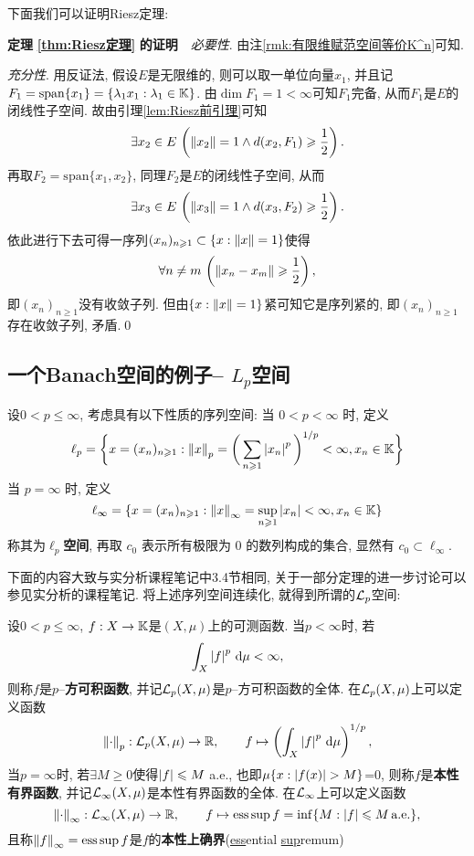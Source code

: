 	下面我们可以证明Riesz定理:

	\textbf{定理\,\,\ref{thm:Riesz定理}\,\,的证明}\ \ \textsl{必要性}. 由注\ref{rmk:有限维赋范空间等价K^n}可知.

	\textsl{充分性}. 用反证法, 假设$ E $是无限维的, 则可以取一单位向量$ x_1 $, 并且记$ F_1=\mathrm{span}\{x_1\}=\{ \lambda_1x_1 : \lambda_1\in\mathbb{K} \} $. 由$ \dim F_1=1<\infty $可知$ F_1 $完备, 从而$ F_1 $是$ E $的闭线性子空间. 故由引理\ref{lem:Riesz前引理}可知
	\[
	\exists x_2\in E\,\left(\left\| x_2 \right\|=1\land d(x_2,F_1)\geqslant\frac{1}{2}\right).
	\]
	再取$ F_2=\mathrm{span}\{x_1,x_2\} $, 同理$ F_2 $是$ E $的闭线性子空间, 从而
	\[
	\exists x_3\in E\,\left(\left\| x_3 \right\|=1\land d(x_3,F_2)\geqslant\frac{1}{2}\right).
	\]
	依此进行下去可得一序列$ (x_n)_{n\geqslant 1}\subset\{ x : \left\| x \right\|=1 \} $使得
	\[
	\forall n\ne m\,\left(\left\| x_n-x_m \right\|\geqslant\frac{1}{2}\right),
	\]
	即$ (x_n)_{n\geqslant 1} $没有收敛子列. 但由$ \{ x : \left\| x \right\|=1 \} $紧可知它是序列紧的, 即$ (x_n)_{n\geqslant 1} $存在收敛子列, 矛盾.\qed

	\subsection{一个Banach空间的例子-- $ L_p $空间}

	\begin{Definition}[$ \ell_{p} $空间]\label{def:lp空间}
		设$ 0<p\leqslant\infty $, 考虑具有以下性质的序列空间:
		当 $ 0<p<\infty $ 时, 定义
		\[
			\ell_{p}=\bigg\{ x=(x_{n})_{n\geqslant1}: \left\| x \right\|_{p}=\bigg( \sum\limits_{n\geqslant1}\left| x_{n} \right| ^{p} \bigg)^{1/p}<\infty, x_{n}\in\mathbb{K} \bigg\}
		\]
		 当 $ p=\infty $ 时, 定义
		 \[
			 \ell_{\infty}=\{ x=(x_{n})_{n\geqslant1}:\left\| x \right\|_{\infty}=\sup_{n\geqslant1}\left| x_{n} \right| <\infty, x_{n}\in\mathbb{K} \}
		 \]
		 称其为\textbf{$ \ell_{p} $空间}, 再取 $ c_{0} $ 表示所有极限为 $ 0 $ 的数列构成的集合, 显然有 $ c_{0}\subset\ell_{\infty} $.
	\end{Definition}

	下面的内容大致与实分析课程笔记中3.4节相同, 关于一部分定理的进一步讨论可以参见实分析的课程笔记. 将上述序列空间连续化, 就得到所谓的$ \CL_p $空间:

	\begin{Definition}[$ \CL_p $空间]\label{def:Lp空间}
		设$ 0<p\leqslant\infty $, $ f : X\to\mathbb{K} $是$ (X,\mu) $上的可测函数. 当$ p<\infty $时, 若
		\[
		\int_X\left| f \right| ^p\,\mathrm{d}\mu<\infty,
		\]
		则称$ f $是$ p $--\textbf{方可积函数}, 并记$ \mathcal{L}_p(X,\mu) $是$ p $--方可积函数的全体. 在$ \mathcal{L}_p(X,\mu) $上可以定义函数
		\[
		\left\| \cdot \right\|_p : \mathcal{L}_p(X,\mu)\to\mathbb{R},\qquad f\mapsto\left(\int_X\left| f \right| ^p\,\mathrm{d}\mu\right)^{1/p},
		\]
		当$ p=\infty $时, 若$ \exists M\geqslant 0 $使得$ \left| f \right| \leqslant M $ a.e., 也即$ \mu\{ x : \left| f(x) \right| >M \} $=0, 则称$ f $是\textbf{本性有界函数}, 并记$ \mathcal{L}_\infty(X,\mu) $是本性有界函数的全体. 在$ \mathcal{L}_\infty $上可以定义函数
		\[
		\left\| \cdot \right\|_\infty : \mathcal{L}_\infty(X,\mu)\to\mathbb{R},\qquad f\mapsto\operatorname{ess\,sup} f=\inf\{ M : \left| f \right| \leqslant M \text{\,a.e.} \},
		\]
		且称$ \left\| f \right\|_\infty=\operatorname{ess\,sup} f $是$ f $的\textbf{本性上确界}(\underline{ess}ential \underline{sup}remum)
	\end{Definition}

